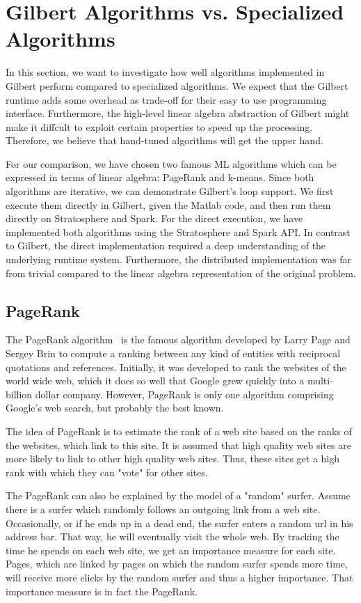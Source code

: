\section{Gilbert Algorithms vs. Specialized Algorithms}

In this section, we want to investigate how well algorithms implemented in Gilbert perform compared to specialized algorithms.
We expect that the Gilbert runtime adds some overhead as trade-off for their easy to use programming interface.
Furthermore, the high-level linear algebra abstraction of Gilbert might make it diffcult to exploit certain properties to speed up the processing.
Therefore, we believe that hand-tuned algorithms will get the upper hand.

For our comparison, we have chosen two famous ML algorithms which can be expressed in terms of linear algebra: PageRank and k-means.
Since both algorithms are iterative, we can demonstrate Gilbert's loop support.
We first execute them directly in Gilbert, given the Matlab code, and then run them directly on Stratosphere and Spark.
For the direct execution, we have implemented both algorithms using the Stratosphere and Spark API.
In contrast to Gilbert, the direct implementation required a deep understanding of the underlying runtime system.
Furthermore, the distributed implementation was far from trivial compared to the linear algebra representation of the original problem.

\subsection{PageRank}

The PageRank algorithm~\cite{page:1999a} is the famous algorithm developed by Larry Page and Sergey Brin to compute a ranking between any kind of entities with reciprocal quotations and references.
Initially, it was developed to rank the websites of the world wide web, which it does so well that Google grew quickly into a multi-billion dollar company.
However, PageRank is only one algorithm comprising Google's web search, but probably the best known.

The idea of PageRank is to estimate the rank of a web site based on the ranks of the websites, which link to this site.
It is assumed that high quality web sites are more likely to link to other high quality web sites.
Thus, these sites get a high rank with which they can "vote" for other sites.

The PageRank can also be explained by the model of a "random" surfer.
Assume there is a surfer which randomly follows an outgoing link from a web site.
Occasionally, or if he ends up in a dead end, the surfer enters a random url in his address bar.
That way, he will eventually visit the whole web.
By tracking the time he spends on each web site, we get an importance measure for each site.
Pages, which are linked by pages on which the random surfer spends more time, will receive more clicks by the random surfer and thus a higher importance.
That importance measure is in fact the PageRank.

